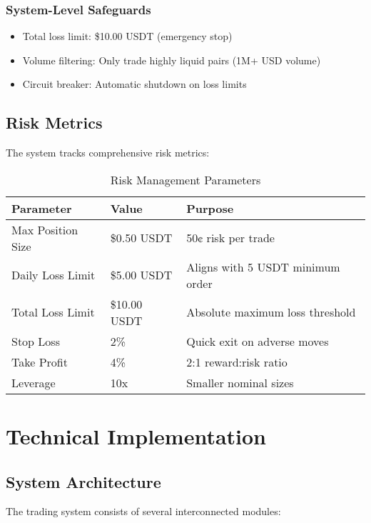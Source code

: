\documentclass[12pt,a4paper]{article}
\begin{document}
\subsubsection{System-Level Safeguards}
\begin{itemize}
\item Total loss limit: \$10.00 USDT (emergency stop)
\item Volume filtering: Only trade highly liquid pairs (1M+ USD volume)
\item Circuit breaker: Automatic shutdown on loss limits
\end{itemize}

\subsection{Risk Metrics}
The system tracks comprehensive risk metrics:

\begin{table}[H]
\centering
\caption{Risk Management Parameters}
\begin{tabular}{@{}lll@{}}
\toprule
Parameter & Value & Purpose \\
\midrule
Max Position Size & \$0.50 USDT & 50¢ risk per trade \\
Daily Loss Limit & \$5.00 USDT & Aligns with 5 USDT minimum order \\
Total Loss Limit & \$10.00 USDT & Absolute maximum loss threshold \\
Stop Loss & 2\% & Quick exit on adverse moves \\
Take Profit & 4\% & 2:1 reward:risk ratio \\
Leverage & 10x & Smaller nominal sizes \\
\bottomrule
\end{tabular}
\end{table}

\section{Technical Implementation}

\subsection{System Architecture}
The trading system consists of several interconnected modules:
\end{document}
